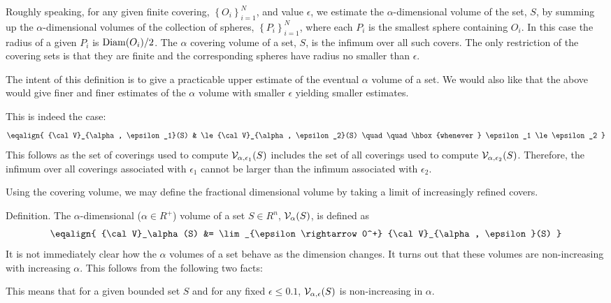 {Roughly speaking, for any given finite covering, 
$\left\{ O_i \right\}_{i=1}^N$, and value $\epsilon$, 
we estimate the $\alpha$-dimensional volume of the set, $S$, by summing 
up the $\alpha$-dimensional volumes of the collection of spheres, 
$\left\{ P_i \right\}_{i=1}^N$, where each $P_i$ is the 
smallest sphere containing $O_i$. In this case the radius of a given 
$P_i$ is ${\rm Diam}(O_i) / 2$.
The $\alpha$ covering volume of a set, $S$, is the infimum over all 
such covers. The only restriction of the covering sets is that they are 
finite and the corresponding spheres have radius no smaller than $\epsilon$.

The intent of this definition is to give a practicable upper estimate of 
the eventual $\alpha$ volume of a set. We would also like that the above 
would give finer and finer estimates of the $\alpha$ volume with 
smaller $\epsilon$ yielding smaller estimates.

This is indeed the case:
$$
\eqalign{
	{\cal V}_{\alpha, \epsilon_1}(S) & \le {\cal V}_{\alpha, \epsilon_2}(S) \quad \quad \hbox{whenever  } \epsilon_1 \le \epsilon_2
}
$$
This follows as the set of coverings used to compute 
${\cal V}_{\alpha, \epsilon_1}(S)$ includes the set of all coverings used 
to compute ${\cal V}_{\alpha, \epsilon_2}(S)$. Therefore, the 
infimum over all coverings associated with $\epsilon_1$ cannot be larger
than the infimum associated with $\epsilon_2$.

Using the covering volume, we may define the fractional dimensional volume by
taking a limit of increasingly refined covers.

\proclaim Definition. The $\alpha$-dimensional ($\alpha \in R^{+}$)
volume of a set $S \in R^n$, ${\cal V}_\alpha(S)$,
is defined as
$$
\eqalign{
	{\cal V}_\alpha(S) &= \lim_{\epsilon \rightarrow 0^+} {\cal V}_{\alpha, \epsilon}(S)
}
$$
It is not immediately clear how the $\alpha$ volumes of a set behave as the 
dimension changes. It turns out that these volumes are non-increasing 
with increasing $\alpha$. This follows from the following two facts:

\beginEnum
{}
This means that for a given bounded set $S$ and for any fixed 
		$\epsilon \le 0.1$, ${\cal V}_{\alpha, \epsilon}(S)$ is 
	    non-increasing in $\alpha$.
\endEnum

}
